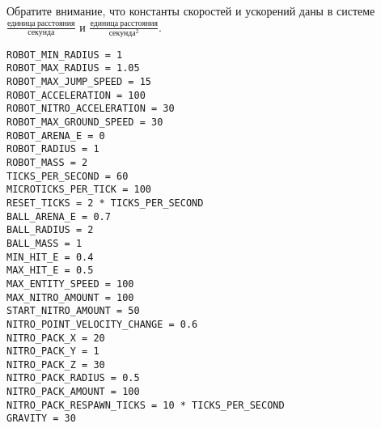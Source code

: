 Обратите внимание, что константы скоростей и ускорений даны в системе
$\frac{единица\ расстояния}{секунда}$ и $\frac{единица\ расстояния}{секунда^2}$.

\begin{verbatim}
ROBOT_MIN_RADIUS = 1
ROBOT_MAX_RADIUS = 1.05
ROBOT_MAX_JUMP_SPEED = 15
ROBOT_ACCELERATION = 100
ROBOT_NITRO_ACCELERATION = 30
ROBOT_MAX_GROUND_SPEED = 30
ROBOT_ARENA_E = 0
ROBOT_RADIUS = 1
ROBOT_MASS = 2
TICKS_PER_SECOND = 60
MICROTICKS_PER_TICK = 100
RESET_TICKS = 2 * TICKS_PER_SECOND
BALL_ARENA_E = 0.7
BALL_RADIUS = 2
BALL_MASS = 1
MIN_HIT_E = 0.4
MAX_HIT_E = 0.5
MAX_ENTITY_SPEED = 100
MAX_NITRO_AMOUNT = 100
START_NITRO_AMOUNT = 50
NITRO_POINT_VELOCITY_CHANGE = 0.6
NITRO_PACK_X = 20
NITRO_PACK_Y = 1
NITRO_PACK_Z = 30
NITRO_PACK_RADIUS = 0.5
NITRO_PACK_AMOUNT = 100
NITRO_PACK_RESPAWN_TICKS = 10 * TICKS_PER_SECOND
GRAVITY = 30
\end{verbatim}
